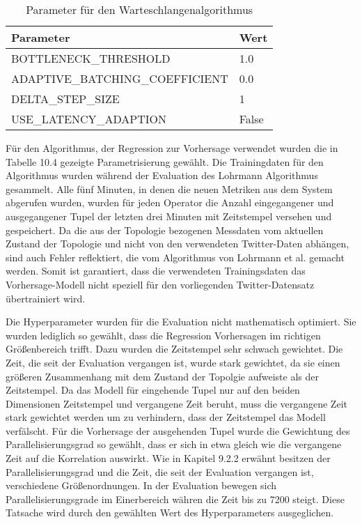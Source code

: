 \begin{table}
\caption{Parameter für den Warteschlangenalgorithmus}
\centering
\begin{tabular}{ll}
\hline
\textbf{Parameter} & \textbf{Wert} \\ \hline
BOTTLENECK\_THRESHOLD & 1.0 \\
ADAPTIVE\_BATCHING\_COEFFICIENT & 0.0 \\
DELTA\_STEP\_SIZE & 1 \\
USE\_LATENCY\_ADAPTION & False\\
\hline
\end{tabular}
\end{table}

Für den Algorithmus, der Regression zur Vorhersage verwendet wurden die in Tabelle 10.4 gezeigte Parametrisierung gewählt.
Die Trainingdaten für den Algorithmus wurden während der Evaluation des Lohrmann Algorithmus gesammelt.
Alle fünf Minuten, in denen die neuen Metriken aus dem System abgerufen wurden, wurden für jeden Operator die Anzahl eingegangener und ausgegangener Tupel der letzten drei Minuten mit Zeitstempel versehen und gespeichert.
Da die aus der Topologie bezogenen Messdaten vom aktuellen Zustand der Topologie und nicht von den verwendeten Twitter-Daten abhängen, sind auch Fehler reflektiert, die vom Algorithmus von Lohrmann et al. gemacht werden.
Somit ist garantiert, dass die verwendeten Trainingsdaten das Vorhersage-Modell nicht speziell für den vorliegenden Twitter-Datensatz übertrainiert wird.

Die Hyperparameter wurden für die Evaluation nicht mathematisch optimiert.
Sie wurden lediglich so gewählt, dass die Regression Vorhersagen im richtigen Größenbereich trifft.
Dazu wurden die Zeitstempel sehr schwach gewichtet.
Die Zeit, die seit der Evaluation vergangen ist, wurde stark gewichtet, da sie einen größeren Zusammenhang mit dem Zustand der Topolgie aufweiste als der Zeitstempel.
Da das Modell für eingehende Tupel nur auf den beiden Dimensionen Zeitstempel und vergangene Zeit beruht, muss die vergangene Zeit stark gewichtet werden um zu verhindern, dass der Zeitstempel das Modell verfälscht.
Für die Vorhersage der ausgehenden Tupel wurde die Gewichtung des Parallelisierungsgrad so gewählt, dass er sich in etwa gleich wie die vergangene Zeit auf die Korrelation auswirkt.
Wie in Kapitel 9.2.2 erwähnt besitzen der Parallelisierungsgrad und die Zeit, die seit der Evaluation vergangen ist, verschiedene Größenordnungen.
In der Evaluation bewegen sich Parallelisierungsgrade im Einerbereich währen die Zeit bis zu 7200 steigt.
Diese Tatsache wird durch den gewählten Wert des Hyperparameters ausgeglichen.

